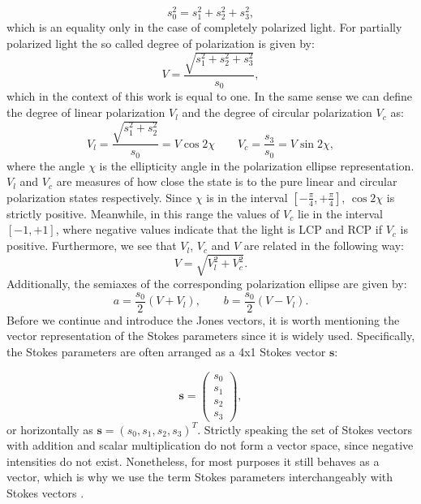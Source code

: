 \begin{equation}
    \label{eq:stokes_char_eq}
    s_0^2 = s_1^2 + s_2^2 + s_3^2,
\end{equation}
which is an equality only in the case of completely polarized light. For partially polarized light the so called degree of polarization is given by:
\begin{equation}
    V = \frac{\sqrt{s_1^2 + s_2^2 + s_3^2}}{s_0},
\end{equation}
which in the context of this work is equal to one. In the same sense we can define the degree of linear polarization $V_l$ and the degree of circular polarization $V_c$ as:
\begin{equation}
    V_l = \frac{\sqrt{s_1^2+s_2^2}}{s_0} = V \cos 2\chi \qquad V_c = \frac{s_3}{s_0} = V \sin 2\chi,
\end{equation} %
where the angle $\chi$ is the ellipticity angle in the polarization ellipse representation. $V_l$ and $V_c$ are measures of how close the state is to the pure linear and circular polarization states respectively. Since $\chi$ is in the interval $\left[-\frac{\pi}{4}, +\frac{\pi}{4}\right]$, $\cos 2\chi$ is strictly positive. Meanwhile, in this range the values of $V_c$ lie in the interval $\left[-1, +1\right]$, where negative values indicate that the light is LCP and RCP if $V_c$ is positive. Furthermore, we see that $V_l$, $V_c$ and $V$ are related in the following way:
\begin{equation}
    V = \sqrt{V_l^2 + V_c^2}.
\end{equation}
Additionally, the semiaxes of the corresponding polarization ellipse are given by:
\begin{equation}
    a=\frac{s_0}{2}(V+V_l), \qquad b=\frac{s_0}{2}(V-V_l).
\end{equation}
Before we continue and introduce the Jones vectors, it is worth mentioning the vector representation of the Stokes parameters since it is widely used. Specifically, the Stokes parameters are often arranged as a 4x1 Stokes vector $\bm{s}$:

\begin{equation}
    \bm{s}=
    \begin{pmatrix}
    s_0 \\
    s_1 \\
    s_2 \\
    s_3
    \end{pmatrix},
\end{equation}
or horizontally as $\bm{s}=(s_0, s_1, s_2, s_3)^T$. Strictly speaking the set of Stokes vectors with addition and scalar multiplication do not form a vector space, since negative intensities do not exist. Nonetheless, for most purposes it still behaves as a vector, which is why we use the term Stokes parameters interchangeably with Stokes vectors \cite{Hecht, Shurcliff1962, GilPerez2017}.

